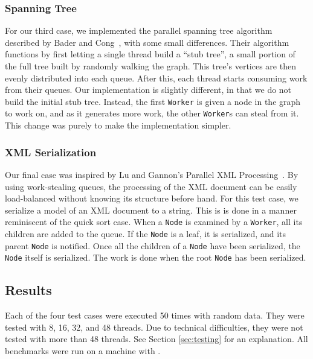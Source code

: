 \subsubsection{Spanning Tree} %
For our third case, we implemented the parallel spanning tree algorithm described by Bader and Cong~\cite{Bader04afast}, with some small differences. Their algorithm functions by first letting a single thread build a ``stub tree'', a small portion of the full tree built by randomly walking the graph. This tree's vertices are then evenly distributed into each queue. After this, each thread starts consuming work from their queues. Our implementation is slightly different, in that we do not build the initial stub tree. Instead, the first \texttt{Worker} is given a node in the graph to work on, and as it generates more work, the other \texttt{Worker}s can steal from it. This change was purely to make the implementation simpler.

\subsubsection{XML Serialization} %
Our final case was inspired by Lu and Gannon's Parallel XML Processing~\cite{Lu:2007:PXP:1272457.1272462}. By using work-stealing queues, the processing of the XML document can be easily load-balanced without knowing its structure before hand. For this test case, we serialize a model of an XML document to a string. This is is done in a manner reminiscent of the quick sort case. When a \texttt{Node} is examined by a \texttt{Worker}, all its children are added to the queue. If the \texttt{Node} is a leaf, it is serialized, and its parent \texttt{Node} is notified. Once all the children of a \texttt{Node} have been serialized, the \texttt{Node} itself is serialized. The work is done when the root \texttt{Node} has been serialized.

\subsection{Results}
Each of the four test cases were executed 50 times with random data. They were tested with 8, 16, 32, and 48 threads. Due to technical difficulties, they were not tested with more than 48 threads. See Section \ref{sec:testing} for an explanation. All benchmarks were run on a machine with .
